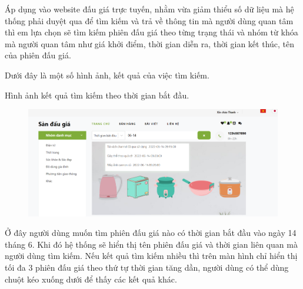 \documentclass[../DoAn.tex]{subfiles}
\begin{document}
Áp dụng vào website đấu giá trực tuyến, nhằm vừa giảm thiểu số dữ liệu mà hệ thống phải duyệt qua để tìm kiếm và trả về thông tin mà người dùng quan tâm thì em lựa chọn sẽ tìm kiếm phiên đấu giá theo từng trạng thái và nhóm từ khóa mà người quan tâm như giá khởi điểm, thời gian diễn ra, thời gian kết thúc, tên của phiên đấu giá. 

Dưới đây là một số hình ảnh, kết quả của việc tìm kiếm.

Hình ảnh kết quả tìm kiếm theo thời gian bắt đầu.
\begin{figure}[H]
    \centering
    \includegraphics[width=0.75\linewidth,height=4.8cm]{Hinhve/searchstartime.png}
\end{figure}
Ở đây người dùng muốn tìm phiên đấu giá nào có thời gian bắt đầu vào ngày 14 tháng 6. Khi đó hệ thống sẽ hiển thị tên phiên đấu giá và thời gian liên quan mà người dùng tìm kiếm. Nếu kết quả tìm kiếm nhiều thì trên màn hình chỉ hiển thị tối đa 3 phiên đấu giá theo thứ tự thời gian tăng dần, người dùng có thể dùng chuột kéo xuống dưới để thấy các kết quả khác. 
\end{document}
